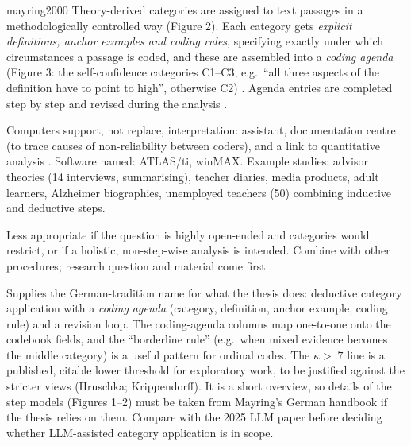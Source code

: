 \begin{papercard}{mayring2000}
 Theory-derived categories are assigned to text passages in a methodologically controlled way (Figure 2). Each category gets \emph{explicit definitions, anchor examples and coding rules}, specifying exactly under which circumstances a passage is coded, and these are assembled into a \emph{coding agenda} (Figure 3: the self-confidence categories C1--C3, e.g.\ ``all three aspects of the definition have to point to high'', otherwise C2) . Agenda entries are completed step by step and revised during the analysis .

 Computers support, not replace, interpretation: assistant, documentation centre (to trace causes of non-reliability between coders), and a link to quantitative analysis . Software named: ATLAS/ti, winMAX. Example studies: advisor theories (14 interviews, summarising), teacher diaries, media products, adult learners, Alzheimer biographies, unemployed teachers (50) combining inductive and deductive steps.

 Less appropriate if the question is highly open-ended and categories would restrict, or if a holistic, non-step-wise analysis is intended. Combine with other procedures; research question and material come first .

 Supplies the German-tradition name for what the thesis does: deductive category application with a \emph{coding agenda} (category, definition, anchor example, coding rule) and a revision loop. The coding-agenda columns map one-to-one onto the codebook fields, and the ``borderline rule'' (e.g.\ when mixed evidence becomes the middle category) is a useful pattern for ordinal codes. The $\kappa>.7$ line is a published, citable lower threshold for exploratory work, to be justified against the stricter views (Hruschka; Krippendorff). It is a short overview, so details of the step models (Figures 1--2) must be taken from Mayring's German handbook if the thesis relies on them. Compare with the 2025 LLM paper before deciding whether LLM-assisted category application is in scope.
\end{papercard}
